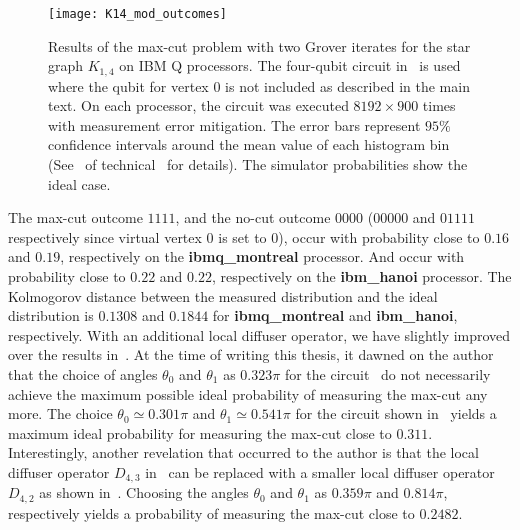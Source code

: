 \begin{figure}[h]
    \centering
    \texttt{[image: K14\_mod\_outcomes]}
    \caption[Results of the \acs{max-cut} problem with two Grover iterates for the star graph $K_{1,4}$ on IBM Q processors.]{Results of the \acs{max-cut} problem with two Grover iterates for the star graph $K_{1,4}$ on IBM Q processors. The four-qubit circuit in~\protect{} is used where the qubit for vertex $0$ is not included as described in the main text. On each processor, the circuit was executed ${8192 \times 900}$ times with measurement error mitigation. The error bars represent ${95\%}$ confidence intervals around the mean value of each histogram bin (See~\protect{} of technical~\protect{} for details). The simulator probabilities show the ideal case.}
\end{figure}

\clearpage
\noindent
The \acs{max-cut} outcome $1111$, and the no-cut outcome $0000$ ($00000$ and $01111$ respectively since virtual vertex $0$ is set to $0$), occur with probability close to $0.16$ and $0.19$, respectively on the \textbf{ibmq\_montreal} processor. And occur with probability close to $0.22$ and $0.22$, respectively on the \textbf{ibm\_hanoi} processor. The Kolmogorov distance between the measured distribution and the ideal distribution is $0.1308$ and $0.1844$ for \textbf{ibmq\_montreal} and \textbf{ibm\_hanoi}, respectively. With an additional local diffuser operator, we have slightly improved over the results in~. At the time of writing this thesis, it dawned on the author that the choice of angles $\theta_0$ and $\theta_1$ as $0.323\pi$ for the circuit~ do not necessarily achieve the maximum possible ideal probability of measuring the \acs{max-cut} any more. The choice $\theta_0 \simeq 0.301 \pi$ and $\theta_1 \simeq 0.541 \pi$ for the circuit shown in~ yields a maximum ideal probability for measuring the \acs{max-cut} close to $0.311$. Interestingly, another revelation that occurred to the author is that the local diffuser operator $D_{4,3}$ in~ can be replaced with a smaller local diffuser operator $D_{4,2}$ as shown in~. Choosing the angles $\theta_0$ and $\theta_1$ as $0.359\pi$ and $0.814\pi$, respectively yields a probability of measuring the \acs{max-cut} close to $0.2482$.

